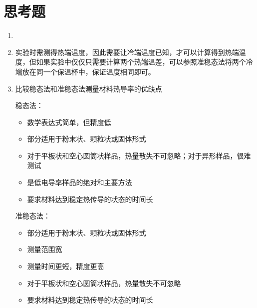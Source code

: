 \section{思考题}
    \begin{enumerate}
        \item {}
        \item {}
        {实验时需测得热端温度，因此需要让冷端温度已知，才可以计算得到热端温度，但如果实验中仅仅只需要计算两个热端温差，可以参照准稳态法将两个冷端放在同一个保温杯中，保证温度相同即可。}
        \item {比较稳态法和准稳态法测量材料热导率的优缺点}{
            稳态法：
            \begin{itemize}
                \item 数学表达式简单，但精度低
                \item 部分适用于粉末状、颗粒状或固体形式
                \item 对于平板状和空心圆筒状样品，热量散失不可忽略；对于异形样品，很难测试
                \item 是低电导率样品的绝对和主要方法
                \item 要求材料达到稳定热传导的状态的时间长
            \end{itemize}\par
            准稳态法：
            \begin{itemize}
                \item 部分适用于粉末状、颗粒状或固体形式
                \item 测量范围宽
                \item 测量时间更短，精度更高
                \item 对于平板状和空心圆筒状样品，热量散失不可忽略
                \item 要求材料达到稳定热传导的状态的时间长

\end{itemize}}
\end{enumerate}
